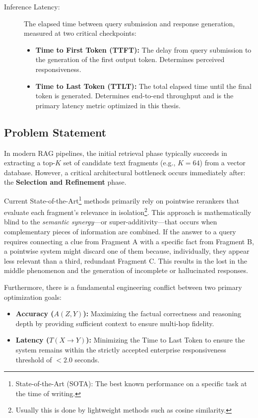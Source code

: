 \begin{description}
    \item[Inference Latency:] The elapsed time between query submission 
    and response generation, measured at two critical checkpoints:
    \begin{itemize}
        \item \textbf{Time to First Token (TTFT):} The delay from query 
        submission to the generation of the first output token. 
        Determines perceived responsiveness.
        \item \textbf{Time to Last Token (TTLT):} The total elapsed time 
        until the final token is generated. Determines end-to-end 
        throughput and is the primary latency metric optimized in this 
        thesis.
    \end{itemize}

\end{description}

\subsection{Problem Statement}
\label{subsec:problem-statement}

In modern RAG pipelines, the initial retrieval phase typically succeeds in extracting a top-$K$ set of candidate text fragments (e.g., $K=64$) from a vector database. However, a critical architectural bottleneck occurs immediately after: the \textbf{Selection and Refinement} phase.

Current State-of-the-Art\footnote{State-of-the-Art (SOTA): The best known performance on a specific task at the time of writing.} methods primarily rely on pointwise rerankers that evaluate each fragment's relevance in isolation\footnote{Usually this is done by lightweight methods such as cosine similarity.}. This approach is mathematically blind to the \textit{semantic synergy}---or super-additivity---that occurs when complementary pieces of information are combined. If the answer to a query requires connecting a clue from Fragment A with a specific fact from Fragment B, a pointwise system might discard one of them because, individually, they appear less relevant than a third, redundant Fragment C. This results in the lost in the middle phenomenon and the generation of incomplete or hallucinated responses.

Furthermore, there is a fundamental engineering conflict between two primary optimization goals:
\begin{itemize}
    \item \textbf{Accuracy (\boldmath$A(Z, Y)$):} Maximizing the factual correctness and reasoning depth by providing sufficient context to ensure multi-hop fidelity.
    \item \textbf{Latency (\boldmath$T(X \rightarrow Y)$):} Minimizing the Time to Last Token to ensure the system remains within the strictly accepted enterprise responsiveness threshold of $< 2.0$ seconds.
\end{itemize}


